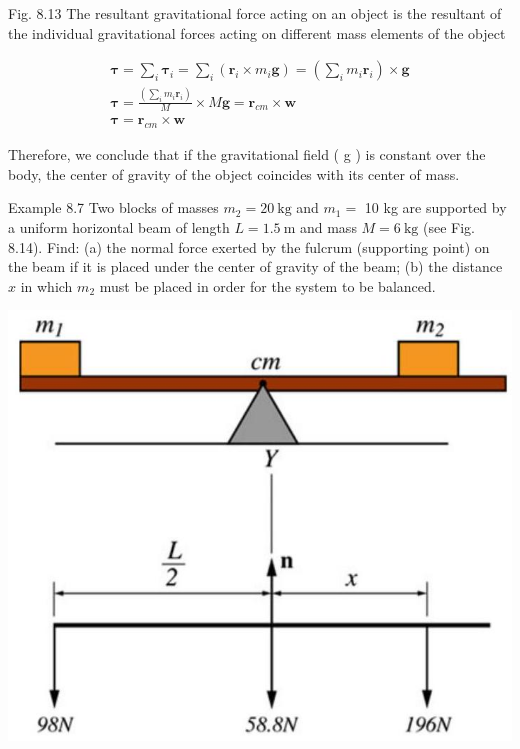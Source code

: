 \documentclass[10pt]{article}
\begin{document}
Fig. 8.13 The resultant gravitational force acting on an object is the resultant of the individual gravitational forces acting on different mass elements of the object

$$
\begin{gathered}
\boldsymbol{\tau}=\sum_{i} \boldsymbol{\tau}_{i}=\sum_{i}\left(\mathbf{r}_{i} \times m_{i} \mathbf{g}\right)=\left(\sum_{i} m_{i} \mathbf{r}_{i}\right) \times \mathbf{g} \\
\boldsymbol{\tau}=\frac{\left(\sum_{i} m_{i} \mathbf{r}_{i}\right)}{M} \times M \mathbf{g}=\mathbf{r}_{c m} \times \mathbf{w} \\
\boldsymbol{\tau}=\mathbf{r}_{c m} \times \mathbf{w}
\end{gathered}
$$

Therefore, we conclude that if the gravitational field ( g ) is constant over the body, the center of gravity of the object coincides with its center of mass.

Example 8.7 Two blocks of masses $m_{2}=20 \mathrm{~kg}$ and $m_{1}=$ 10 kg are supported by a uniform horizontal beam of length $L=1.5 \mathrm{~m}$ and mass $M=6 \mathrm{~kg}$ (see Fig. 8.14). Find: (a) the normal force exerted by the fulcrum (supporting point) on the beam if it is placed under the center of gravity of the beam; (b) the distance $x$ in which $m_{2}$ must be placed in order for the system to be balanced.

\begin{center}
\includegraphics[max width=\textwidth]{2024_09_13_db1f357d2aad0a03eb2eg-136(2)}
\end{center}
\end{document}
